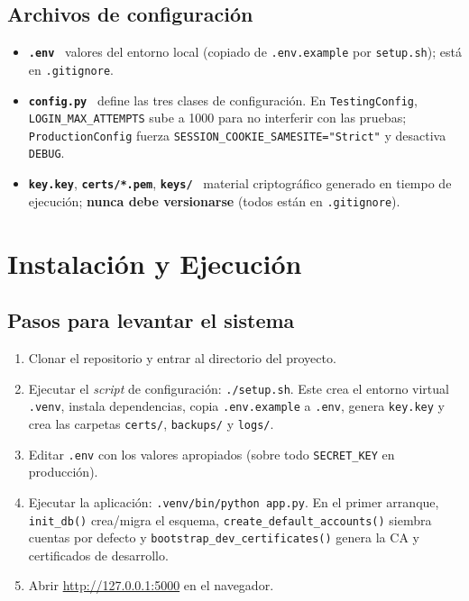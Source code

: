 \documentclass[10pt,letterpaper]{report}
\begin{document}
\section{Archivos de configuraci\'on}
\begin{itemize}
  \item \textbf{\texttt{.env}} \textemdash\ valores del entorno local (copiado de \texttt{.env.example}
  por \texttt{setup.sh}); est\'a en \texttt{.gitignore}.
  \item \textbf{\texttt{config.py}} \textemdash\ define las tres clases de configuraci\'on. En
  \texttt{TestingConfig}, \texttt{LOGIN\_MAX\_ATTEMPTS} sube a 1000 para no interferir con las pruebas;
  \texttt{ProductionConfig} fuerza \texttt{SESSION\_COOKIE\_SAMESITE="Strict"} y desactiva
  \texttt{DEBUG}.
  \item \textbf{\texttt{key.key}}, \textbf{\texttt{certs/*.pem}}, \textbf{\texttt{keys/}} \textemdash\
  material criptogr\'afico generado en tiempo de ejecuci\'on; \textbf{nunca debe versionarse} (todos
  est\'an en \texttt{.gitignore}).
\end{itemize}

\chapter{Instalaci\'on y Ejecuci\'on}

\section{Pasos para levantar el sistema}
\begin{enumerate}
  \item Clonar el repositorio y entrar al directorio del proyecto.
  \item Ejecutar el \emph{script} de configuraci\'on: \texttt{./setup.sh}. Este crea el entorno
  virtual \texttt{.venv}, instala dependencias, copia \texttt{.env.example} a \texttt{.env}, genera
  \texttt{key.key} y crea las carpetas \texttt{certs/}, \texttt{backups/} y \texttt{logs/}.
  \item Editar \texttt{.env} con los valores apropiados (sobre todo \texttt{SECRET\_KEY} en
  producci\'on).
  \item Ejecutar la aplicaci\'on: \texttt{.venv/bin/python app.py}. En el primer arranque,
  \texttt{init\_db()} crea/migra el esquema, \texttt{create\_default\_accounts()} siembra cuentas por
  defecto y \texttt{bootstrap\_dev\_certificates()} genera la CA y certificados de desarrollo.
  \item Abrir \url{http://127.0.0.1:5000} en el navegador.
\end{enumerate}
\end{document}
